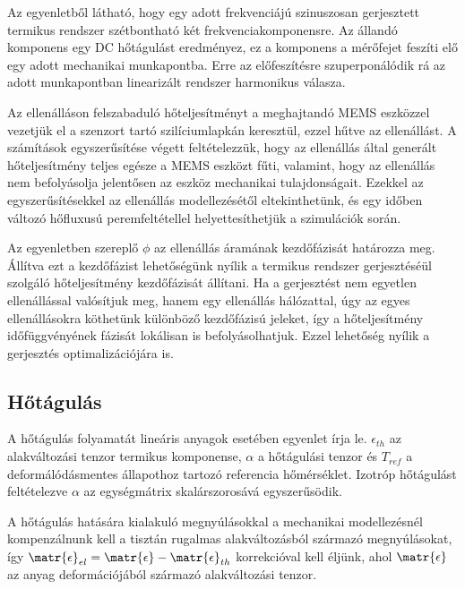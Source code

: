 Az egyenletből látható, hogy egy adott frekvenciájú szinuszosan gerjesztett termikus rendszer szétbontható két frekvenciakomponensre. Az állandó komponens egy DC hőtágulást eredményez, ez a komponens a mérőfejet feszíti elő egy adott mechanikai munkapontba. Erre az előfeszítésre szuperponálódik rá az adott munkapontban linearizált rendszer harmonikus válasza.

Az ellenálláson felszabaduló hőteljesítményt a meghajtandó MEMS eszközzel vezetjük el a szenzort tartó szilíciumlapkán keresztül, ezzel hűtve az ellenállást. A számítások egyszerűsítése végett feltételezzük, hogy az ellenállás által generált hőteljesítmény teljes egésze a MEMS eszközt fűti, valamint, hogy az ellenállás nem befolyásolja jelentősen az eszköz mechanikai tulajdonságait. Ezekkel az egyszerűsítésekkel az ellenállás modellezésétől eltekinthetünk, és egy időben változó hőfluxusú peremfeltétellel helyettesíthetjük a szimulációk során.

Az egyenletben szereplő $\phi$ az ellenállás áramának kezdőfázisát határozza meg. Állítva ezt a kezdőfázist lehetőségünk nyílik a termikus rendszer gerjesztéséül szolgáló hőteljesítmény kezdőfázisát állítani. Ha a gerjesztést nem egyetlen ellenállással valósítjuk meg, hanem egy ellenállás hálózattal, úgy az egyes ellenállásokra köthetünk különböző kezdőfázisú jeleket, így a hőteljesítmény időfüggvényének fázisát lokálisan is befolyásolhatjuk. Ezzel lehetőség nyílik a gerjesztés optimalizációjára is.

\subsection{Hőtágulás}

A hőtágulás folyamatát lineáris anyagok esetében  egyenlet írja le. $\epsilon_{th}$ az alakváltozási tenzor termikus komponense, $\alpha$ a hőtágulási tenzor és $T_{ref}$ a deformálódásmentes állapothoz tartozó referencia hőmérséklet. Izotróp hőtágulást feltételezve $\alpha$ az egységmátrix skalárszorosává egyszerűsödik.


A hőtágulás hatására kialakuló megnyúlásokkal a mechanikai modellezésnél kompenzálnunk kell a tisztán rugalmas alakváltozásból származó megnyúlásokat, így $\matr{\epsilon}_{el} = \matr{\epsilon} - \matr{\epsilon}_{th}$ korrekcióval kell éljünk, ahol $\matr{\epsilon}$ az anyag deformációjából származó alakváltozási tenzor.

